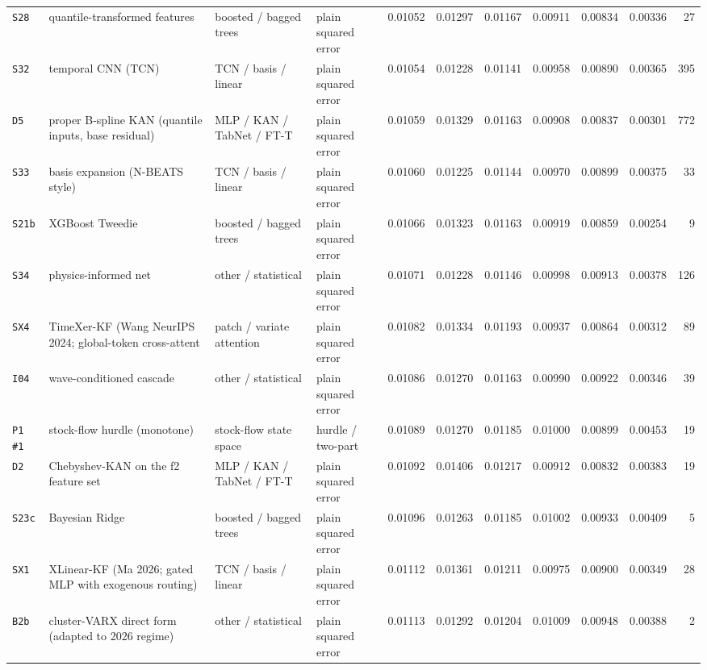 \documentclass[9pt,landscape]{article}
\begin{document}
\begin{longtable}{@{}p{1.1cm}p{5.4cm}p{3.1cm}p{2.7cm}rrrrrrr@{}}
\texttt{S28} & quantile-transformed features & boosted / bagged trees & plain squared error & 0.01052 & 0.01297 & 0.01167 & 0.00911 & 0.00834 & 0.00336 & 27 \\
\texttt{S32} & temporal CNN (TCN) & TCN / basis / linear & plain squared error & 0.01054 & 0.01228 & 0.01141 & 0.00958 & 0.00890 & 0.00365 & 395 \\
\texttt{D5} & proper B-spline KAN (quantile inputs, base residual) & MLP / KAN / TabNet / FT-T & plain squared error & 0.01059 & 0.01329 & 0.01163 & 0.00908 & 0.00837 & 0.00301 & 772 \\
\texttt{S33} & basis expansion (N-BEATS style) & TCN / basis / linear & plain squared error & 0.01060 & 0.01225 & 0.01144 & 0.00970 & 0.00899 & 0.00375 & 33 \\
\texttt{S21b} & XGBoost Tweedie & boosted / bagged trees & plain squared error & 0.01066 & 0.01323 & 0.01163 & 0.00919 & 0.00859 & 0.00254 & 9 \\
\texttt{S34} & physics-informed net & other / statistical & plain squared error & 0.01071 & 0.01228 & 0.01146 & 0.00998 & 0.00913 & 0.00378 & 126 \\
\texttt{SX4} & TimeXer-KF (Wang NeurIPS 2024; global-token cross-attent & patch / variate attention & plain squared error & 0.01082 & 0.01334 & 0.01193 & 0.00937 & 0.00864 & 0.00312 & 89 \\
\texttt{I04} & wave-conditioned cascade & other / statistical & plain squared error & 0.01086 & 0.01270 & 0.01163 & 0.00990 & 0.00922 & 0.00346 & 39 \\
\texttt{P1 \#1} & stock-flow hurdle (monotone) & stock-flow state space & hurdle / two-part & 0.01089 & 0.01270 & 0.01185 & 0.01000 & 0.00899 & 0.00453 & 19 \\
\texttt{D2} & Chebyshev-KAN on the f2 feature set & MLP / KAN / TabNet / FT-T & plain squared error & 0.01092 & 0.01406 & 0.01217 & 0.00912 & 0.00832 & 0.00383 & 19 \\
\texttt{S23c} & Bayesian Ridge & boosted / bagged trees & plain squared error & 0.01096 & 0.01263 & 0.01185 & 0.01002 & 0.00933 & 0.00409 & 5 \\
\texttt{SX1} & XLinear-KF (Ma 2026; gated MLP with exogenous routing) & TCN / basis / linear & plain squared error & 0.01112 & 0.01361 & 0.01211 & 0.00975 & 0.00900 & 0.00349 & 28 \\
\texttt{B2b} & cluster-VARX direct form (adapted to 2026 regime) & other / statistical & plain squared error & 0.01113 & 0.01292 & 0.01204 & 0.01009 & 0.00948 & 0.00388 & 2 \\

\end{longtable}
\end{document}
